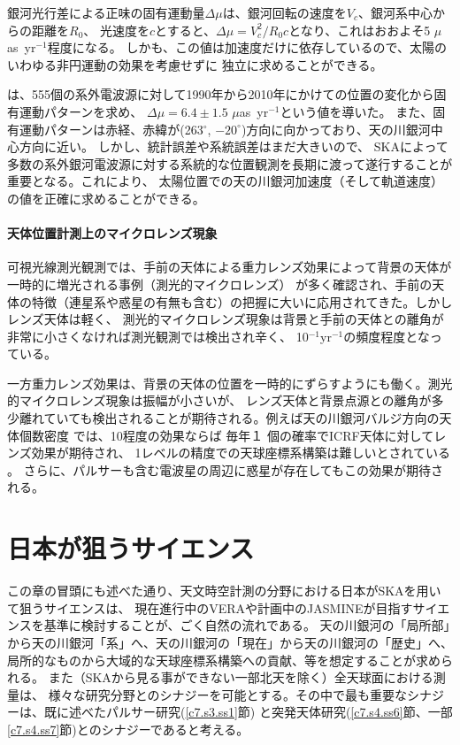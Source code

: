 銀河光行差による正味の固有運動量$\Delta \mu$は、銀河回転の速度を$V_c$、銀河系中心からの距離を$R_0$、
光速度を$c$とすると、$\Delta \mu = V_c^2/R_0 c$となり、これはおおよそ5 $\mu$as~yr$^{-1}$程度になる。
しかも、この値は加速度だけに依存しているので、太陽のいわゆる非円運動の効果を考慮せずに
独立に求めることができる。

\citet{2011A&A...529A..91T}は、555個の系外電波源に対して1990年から2010年にかけての位置の変化から固有運動パターンを求め、
$\Delta \mu = 6.4 \pm 1.5$ $\mu$as~yr$^{-1}$という値を導いた。
また、固有運動パターンは赤経、赤緯が(263$^{\circ}$, $-20^{\circ}$)方向に向かっており、天の川銀河中心方向に近い。
しかし、統計誤差や系統誤差はまだ大きいので、
SKAによって多数の系外銀河電波源に対する系統的な位置観測を長期に渡って遂行することが重要となる。これにより、
太陽位置での天の川銀河加速度（そして軌道速度）の値を正確に求めることができる。

\paragraph{天体位置計測上のマイクロレンズ現象}

可視光線測光観測では、手前の天体による重力レンズ効果によって背景の天体が一時的に増光される事例（測光的マイクロレンズ）
が多く確認され、手前の天体の特徴（連星系や惑星の有無も含む）の把握に大いに応用されてきた。しかしレンズ天体は軽く、
測光的マイクロレンズ現象は背景と手前の天体との離角が非常に小さくなければ測光観測では検出され辛く、
10$^{-1}$yr$^{-1}$の頻度程度となっている。

一方重力レンズ効果は、背景の天体の位置を一時的にずらすようにも働く。測光的マイクロレンズ現象は振幅が小さいが、
レンズ天体と背景点源との離角が多少離れていても検出されることが期待される。例えば天の川銀河バルジ方向の天体個数密度
では、10\uas 程度の効果ならば 毎年１ 個の確率でICRF天体に対してレンズ効果が期待され、
1\uas レベルの精度での天球座標系構築は難しいとされている \citep{1997AJ....114.1508H} 。
さらに、パルサーも含む電波星の周辺に惑星が存在してもこの効果が期待される。


\setcounter{section}{3}\section{日本が狙うサイエンス}\label{c7.s4}

この章の冒頭にも述べた通り、天文時空計測の分野における日本がSKAを用いて狙うサイエンスは、
現在進行中のVERAや計画中のJASMINEが目指すサイエンスを基準に検討することが、ごく自然の流れである。
天の川銀河の「局所部」から天の川銀河「系」へ、天の川銀河の「現在」から天の川銀河の「歴史」へ、
局所的なものから大域的な天球座標系構築への貢献、等を想定することが求められる。
また（SKAから見る事ができない一部北天を除く）全天球面における測量は、
様々な研究分野とのシナジーを可能とする。その中で最も重要なシナジーは、既に述べたパルサー研究(\ref{c7.s3.ss1}節)
と突発天体研究(\ref{c7.s4.ss6}節、一部\ref{c7.s4.ss7}節)とのシナジーであると考える。

